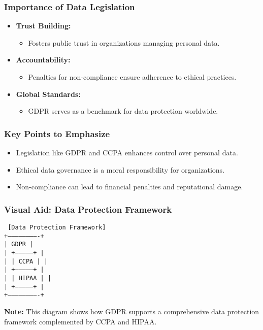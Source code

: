 \documentclass[aspectratio=169]{beamer}
\begin{document}
\begin{frame}[fragile]
    \frametitle{Importance of Data Legislation}
    \begin{itemize}
        \item \textbf{Trust Building:} 
            \begin{itemize}
                \item Fosters public trust in organizations managing personal data.
            \end{itemize}
        \item \textbf{Accountability:} 
            \begin{itemize}
                \item Penalties for non-compliance ensure adherence to ethical practices.
            \end{itemize}
        \item \textbf{Global Standards:} 
            \begin{itemize}
                \item GDPR serves as a benchmark for data protection worldwide.
            \end{itemize}
    \end{itemize}
\end{frame}

\begin{frame}[fragile]
    \frametitle{Key Points to Emphasize}
    \begin{itemize}
        \item Legislation like GDPR and CCPA enhances control over personal data.
        \item Ethical data governance is a moral responsibility for organizations.
        \item Non-compliance can lead to financial penalties and reputational damage.
    \end{itemize}
\end{frame}

\begin{frame}[fragile]
    \frametitle{Visual Aid: Data Protection Framework}
    \begin{center}
        \texttt{
        [Data Protection Framework] \\
        +-------------------------+ \\
        |          GDPR          | \\
        |   +---------------+     | \\
        |   |    CCPA      |     | \\
        |   +---------------+     | \\
        |   |     HIPAA    |     | \\
        |   +---------------+     | \\
        +-------------------------+
        }
    \end{center}
    \textbf{Note:} This diagram shows how GDPR supports a comprehensive data protection framework complemented by CCPA and HIPAA.
\end{frame}
\end{document}
